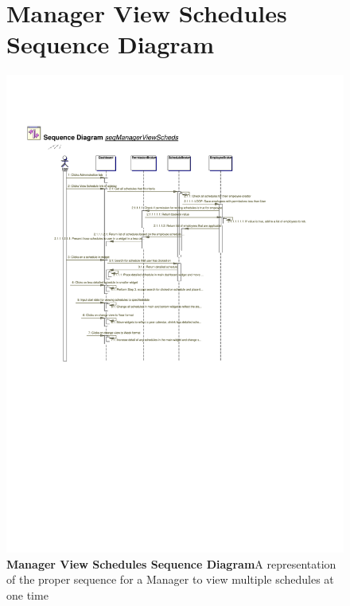\documentclass[letterpaper,12pt]{report}
\begin{document}
\begin{figure}[hbp]
 \section{Manager View Schedules Sequence Diagram}
 \includegraphics[scale=0.65]{externals/SequenceDiagrams13.pdf}
 \caption{\small
\textbf{Manager View Schedules Sequence Diagram}\newline A representation of the proper sequence for a Manager to view multiple schedules at one time}\label{fig:seqManagerView}
\end{figure}
\newpage
\clearpage
\end{document}

